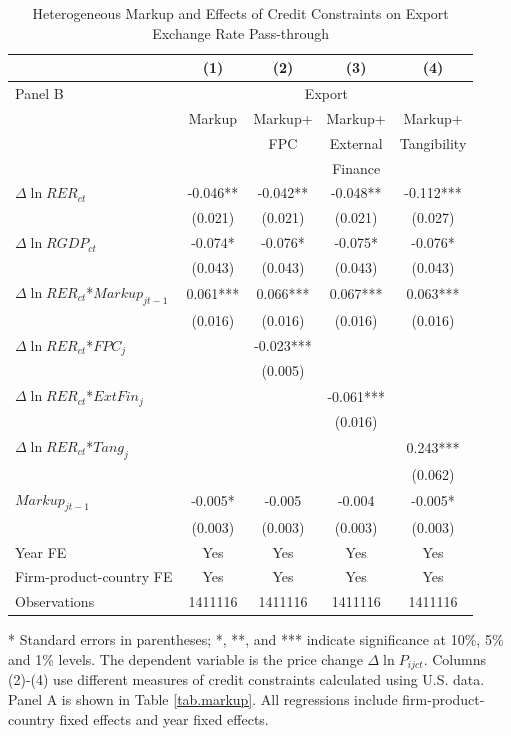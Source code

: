 \documentclass[12pt]{article}
\begin{document}
\begin{table}[htbp]
	\centering
	\caption{Heterogeneous Markup and Effects of Credit Constraints on Export Exchange Rate Pass-through}
	\begin{threeparttable}
		\begin{tabular}{lcccc}
			\midrule          & (1)   & (2)   & (3)   & (4)     \\
			\midrule
			Panel B & \multicolumn{4}{c}{Export} \\
			& Markup & Markup+& Markup+ & Markup+      \\
			&       &FPC& External & Tangibility        \\
			&       & & Finance &  	          \\
			\midrule
			$\Delta \ln RER_{ct}$ & -0.046** & -0.042** & -0.048** & -0.112***  \\
			& (0.021) & (0.021) & (0.021) & (0.027)  \\
			$\Delta \ln RGDP_{ct}$ & -0.074* & -0.076* &-0.075* & -0.076* \\
			& (0.043) & (0.043) & (0.043) & (0.043)  \\
			$\Delta \ln RER_{ct}$*$Markup_{jt-1}$ & 0.061*** & 0.066*** & 0.067*** & 0.063*** \\
			& (0.016) & (0.016) & (0.016) & (0.016) \\
			$\Delta \ln RER_{ct}$*$FPC_{j}$ &       & -0.023*** &       &  \\
			&       & (0.005) &       &   \\
			$\Delta \ln RER_{ct}$*$ExtFin_{j}$ &       &       & -0.061*** &   \\
			&       &       & (0.016) &   \\
			$\Delta \ln RER_{ct}$*$Tang_{j}$ &       &       &       & 0.243***  \\
			&       &       &       & (0.062)  \\
			$Markup_{jt-1}$ & -0.005* & -0.005 & -0.004 & -0.005*  \\
			& (0.003) & (0.003) & (0.003) & (0.003) \\
			Year FE  & Yes   & Yes   & Yes   & Yes       \\
			Firm-product-country FE & Yes   & Yes   & Yes   & Yes       \\
			Observations & 1411116 & 1411116 & 1411116 & 1411116  \\
			\bottomrule
		\end{tabular}
		\begin{tablenotes}
			\footnotesize
			\item[*] Standard errors in parentheses; *, **, and *** indicate significance at 10\%, 5\% and 1\% levels. The dependent variable is the price change $\Delta \ln P_{ijct}$. Columns (2)-(4) use different measures of credit constraints calculated using U.S. data. Panel A is shown in Table \ref{tab.markup}. All regressions include firm-product-country fixed effects and year fixed effects.
		\end{tablenotes}
	\end{threeparttable}
	\label{tabA.2}
\end{table}
\end{document}
